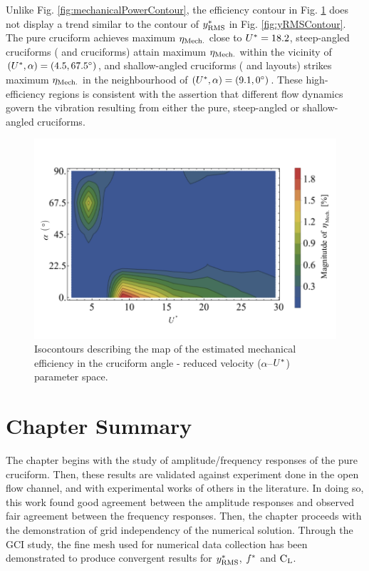 \documentclass[oneside]{utmthesis}
\begin{document}
Unlike Fig. \ref{fig:mechanicalPowerContour}, the efficiency contour in Fig. \ref{fig:powerEfficiencyContour} does not display a trend similar to the contour of $y^{*}_{\text{RMS}}$ in Fig. \ref{fig:yRMSContour}. The pure cruciform achieves maximum $\eta_{\text{Mech.}}$ close to $U^{*} = 18.2$, steep-angled cruciforms (\angfo{} and \angth{} cruciforms) attain maximum $\eta_{\text{Mech.}}$ within the vicinity of $(\ured,\alpha) = (\urtw,\angfo)$, and shallow-angled cruciforms (\angtw{} and \angon{} layouts) strikes maximum $\eta_{\text{Mech.}}$ in the neighbourhood of $(\ured,\alpha) = (\urfo,\angon)$. These high-efficiency regions is consistent with the assertion that different flow dynamics govern the vibration resulting from either the pure, steep-angled or shallow-angled cruciforms.

\begin{figure}[H]
  \centering
  \includegraphics[width=1\textwidth]{figs/powerEfficiencyContours}
  \caption{Isocontours describing the map of the estimated mechanical efficiency in the cruciform angle - reduced velocity ($\alpha$--$U^{*}$) parameter space.}
  \label{fig:powerEfficiencyContour}
\end{figure}

\section{Chapter Summary} \label{ssec:chapSumResults}
The chapter begins with the study of amplitude/frequency responses of the pure cruciform. Then, these results are validated against  experiment done in the open flow channel, and with experimental works of others in the literature. In doing so, this work found good agreement between the amplitude responses and observed fair agreement between the frequency responses. Then, the chapter proceeds with the demonstration of grid independency of the numerical solution. Through the GCI study, the fine mesh used for numerical data collection has been demonstrated to produce convergent results for $y^{*}_{\text{RMS}}$, $f^{*}$ and $\text{C}_{\text{L}}$.
\end{document}
